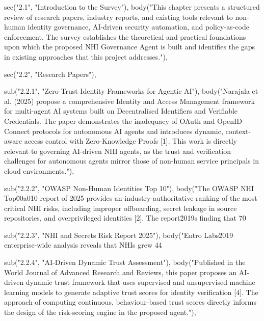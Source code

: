   sec("2.1", "Introduction to the Survey"),
  body("This chapter presents a structured review of research papers, industry reports, and existing tools relevant to non-human identity governance, AI-driven security automation, and policy-as-code enforcement. The survey establishes the theoretical and practical foundations upon which the proposed NHI Governance Agent is built and identifies the gaps in existing approaches that this project addresses."),

  sec("2.2", "Research Papers"),

  sub("2.2.1", "Zero-Trust Identity Frameworks for Agentic AI"),
  body("Narajala et al. (2025) propose a comprehensive Identity and Access Management framework for multi-agent AI systems built on Decentralised Identifiers and Verifiable Credentials. The paper demonstrates the inadequacy of OAuth and OpenID Connect protocols for autonomous AI agents and introduces dynamic, context-aware access control with Zero-Knowledge Proofs [1]. This work is directly relevant to governing AI-driven NHI agents, as the trust and verification challenges for autonomous agents mirror those of non-human service principals in cloud environments."),

  sub("2.2.2", "OWASP Non-Human Identities Top 10"),
  body("The OWASP NHI Top\u00a010 report of 2025 provides an industry-authoritative ranking of the most critical NHI risks, including improper offboarding, secret leakage in source repositories, and overprivileged identities [2]. The report\u2019s finding that 70%

  sub("2.2.3", "NHI and Secrets Risk Report 2025"),
  body("Entro Labs\u2019 enterprise-wide analysis reveals that NHIs grew 44%

  sub("2.2.4", "AI-Driven Dynamic Trust Assessment"),
  body("Published in the World Journal of Advanced Research and Reviews, this paper proposes an AI-driven dynamic trust framework that uses supervised and unsupervised machine learning models to generate adaptive trust scores for identity verification [4]. The approach of computing continuous, behaviour-based trust scores directly informs the design of the risk-scoring engine in the proposed agent."),

